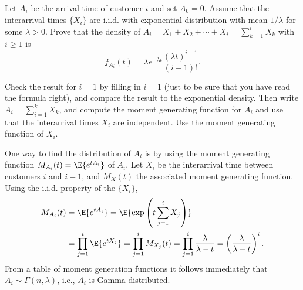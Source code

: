   \begin{question}
 Let $A_i$ be the arrival time of customer $i$ and set $A_0=0$.
    Assume that the interarrival times $\{X_i\}$ are i.i.d.  with
    exponential distribution with mean $1/\lambda$ for some
    $\lambda>0$.  Prove that the density of
    $A_i=X_1+X_2+\cdots+X_i=\sum_{k=1}^i X_k$ with $i\geq 1$ is
\begin{equation*}
f_{A_i}(t) = \lambda e^{-\lambda t} \frac{(\lambda t)^{i-1}}{(i-1)!}. 
\end{equation*}
\begin{hint}
 Check the result for $i=1$ by filling in $i=1$ (just to be
     sure that you have read the formula right), and compare the result
     to the exponential density. Then write $A_i =\sum_{i=1}^k X_k$, and compute the moment
     generating function for $A_i$ and use that the interarrival times
     $X_i$ are independent. Use the moment generating function  of $X_i$.
\end{hint}
\begin{solution}
 One way to find the distribution of $A_i$ is by using the
    moment generating function $M_{A_i}(t) = \E{e^{t A_i}}$ of
    $A_i$. Let $X_i$ be the interarrival time between customers $i$
    and $i-1$, and $M_X(t)$ the associated moment generating
    function. Using the i.i.d. property of the $\{X_i\}$,
\begin{equation*}
  \begin{split}
  M_{A_i}(t) &= \E{e^{t A_i}} = \E{\exp\left(t\sum_{j=1}^{i} X_j\right)} \\
& = \prod_{j=1}^{i} \E{e^{tX_j}} = 
\prod_{j=1}^{i} M_{X_j}(t) = 
\prod_{j=1}^{i} \frac{\lambda}{\lambda -t }
 = \left(\frac{\lambda}{\lambda -t }\right)^i.
  \end{split}
\end{equation*}
From a table of moment generation functions it follows immediately that
$A_i \sim \Gamma(n,\lambda)$, i.e., $A_i$ is Gamma distributed.
\end{solution}

\end{question}

